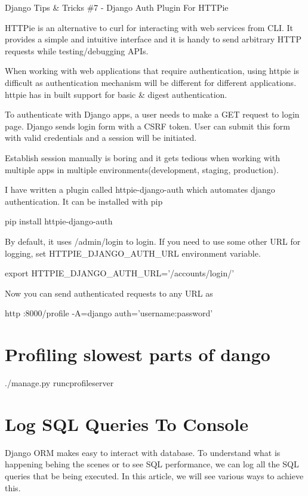 \documentclass[letterpaper,11pt,english]{sphinxmanual}
\begin{document}
Django Tips \& Tricks \#7 - Django Auth Plugin For HTTPie

HTTPie is an alternative to curl for interacting with web services from CLI. It provides a simple and intuitive interface and it is handy to send arbitrary HTTP requests while testing/debugging APIs.

When working with web applications that require authentication, using httpie is difficult as authentication mechanism will be different for different applications. httpie has in built support for basic \& digest authentication.

To authenticate with Django apps, a user needs to make a GET request to login page. Django sends login form with a CSRF token. User can submit this form with valid credentials and a session will be initiated.

Establish session manually is boring and it gets tedious when working with multiple apps in multiple environments(development, staging, production).

I have written a plugin called httpie-django-auth which automates django authentication. It can be installed with pip

pip install httpie-django-auth

By default, it uses /admin/login to login. If you need to use some other URL for logging, set HTTPIE\_DJANGO\_AUTH\_URL environment variable.

export HTTPIE\_DJANGO\_AUTH\_URL=’/accounts/login/’

Now you can send authenticated requests to any URL as

http :8000/profile -A=django \textendash{}auth=’username:password’


\chapter{Profiling slowest parts of dango}
\label{\detokenize{misc_profiling:profiling-slowest-parts-of-dango}}\label{\detokenize{misc_profiling::doc}}
./manage.py runcprofileserver


\chapter{Log SQL Queries To Console}
\label{\detokenize{orm_log_sql:log-sql-queries-to-console}}\label{\detokenize{orm_log_sql::doc}}
Django ORM makes easy to interact with database. To understand what is happening behing the scenes or to see SQL performance, we can log all the SQL queries that be being executed. In this article, we will see various ways to achieve this.
\end{document}
